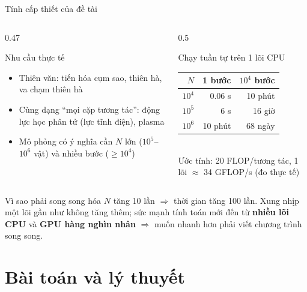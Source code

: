 \documentclass[aspectratio=169,11pt]{beamer}
\newcommand{\nguoi}{}
\newcommand{\nguoinoi}[1]{\renewcommand{\nguoi}{#1}}
\begin{document}
\begin{frame}{Tính cấp thiết của đề tài}
\begin{columns}[T]
\begin{column}{0.47\textwidth}
\begin{block}{Nhu cầu thực tế}
\small
\begin{itemize}
\setlength{\itemsep}{4pt}
\item Thiên văn: tiến hóa cụm sao, thiên hà, va chạm thiên hà
\item Cùng dạng ``mọi cặp tương tác'': động lực học phân tử (lực tĩnh điện), plasma
\item Mô phỏng có ý nghĩa cần \alert{$N$ lớn} ($10^5$--$10^6$ vật) và \alert{nhiều bước} ($\ge10^4$)
\end{itemize}
\end{block}
\end{column}
\begin{column}{0.5\textwidth}
\begin{block}{Chạy tuần tự trên 1 lõi CPU}
\small
\centering
\setlength{\tabcolsep}{7pt}
\begin{tabular}{rrr}
\toprule
$N$ & 1 bước & $10^4$ bước \\
\midrule
$10^4$ & 0.06 s & 10 phút \\
$10^5$ & 6 s & \alert{16 giờ} \\
$10^6$ & 10 phút & \alert{68 ngày} \\
\bottomrule
\end{tabular}\\[3pt]
{\scriptsize\color{xam} Ước tính: 20 FLOP/tương tác, 1 lõi $\approx$ 34 GFLOP/s (đo thực tế)}
\end{block}
\end{column}
\end{columns}
\vspace{6pt}
\begin{alertblock}{Vì sao phải song song hóa}
\small
$N$ tăng 10 lần $\Rightarrow$ thời gian tăng \alert{100 lần}. Xung nhịp một lõi gần như không tăng thêm; sức mạnh tính toán mới đến từ \textbf{nhiều lõi CPU} và \textbf{GPU hàng nghìn nhân} $\Rightarrow$ muốn nhanh hơn phải viết chương trình song song.
\end{alertblock}
\end{frame}

\section{Bài toán và lý thuyết}
\nguoinoi{Trình bày: Vũ Văn Dương}
\end{document}

